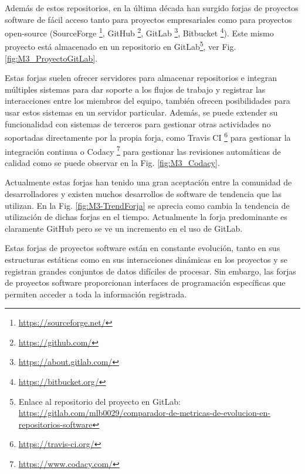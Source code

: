 Además de estos repositorios, en la última década han surgido forjas de proyectos software de fácil acceso tanto para proyectos empresariales como para proyectos open-source (SourceForge \footnote{\url{https://sourceforge.net/}}, GitHub \footnote{\url{https://github.com/}}, GitLab \footnote{\url{https://about.gitlab.com/}}, Bitbucket  \footnote{\url{https://bitbucket.org/}}). Este mismo proyecto está almacenado en un repositorio en GitLab\footnote{Enlace al repositorio del proyecto en GitLab: \url{https://gitlab.com/mlb0029/comparador-de-metricas-de-evolucion-en-repositorios-software}}, ver Fig. \ref{fig:M3_ProyectoGitLab}.


Estas forjas suelen ofrecer servidores para almacenar repositorios e integran múltiples sistemas para dar soporte a los flujos de trabajo y registrar las interacciones entre los miembros del equipo, también ofrecen posibilidades para usar estos sistemas en un servidor particular. Además, se puede extender su funcionalidad con sistemas de terceros para gestionar otras actividades no soportadas directamente por la propia forja, como Travis CI \footnote{\url{https://travis-ci.org/}} para gestionar la integración continua o Codacy \footnote{\url{https://www.codacy.com/}} para gestionar las revisiones automáticas de calidad como se puede observar en la Fig. \ref{fig:M3_Codacy}. 


Actualmente estas forjas han tenido una gran aceptación entre la comunidad de desarrolladores y existen muchos desarrollos de software de tendencia que las utilizan. En la Fig. \ref{fig:M3-TrendForja} se aprecia como cambia la tendencia de utilización de dichas forjas en el tiempo. Actualmente la forja predominante es claramente GitHub pero se ve un incremento en el uso de GitLab.


 Estas forjas de proyectos software están en constante evolución, tanto en sus estructuras estáticas como en sus interacciones dinámicas en los proyectos y se registran grandes conjuntos de datos difíciles de procesar. Sin embargo, las forjas de proyectos software proporcionan interfaces de programación específicas que permiten acceder a toda la información registrada.

